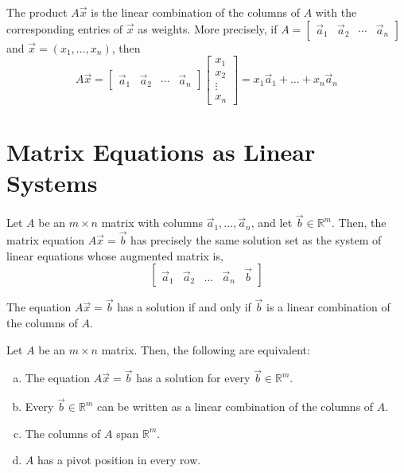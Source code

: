 \documentclass[letterpaper,12pt]{article}
\begin{document}
\begin{theorem}
The product $A\vec{x}$ is the linear combination of the columns of $A$ with the corresponding entries of $\vec{x}$ as weights. More precisely, if $A = \begin{bmatrix} \vec{a}_1 & \vec{a}_2 & \cdots & \vec{a}_n \end{bmatrix}$ and $\vec{x} = (x_1, \dots, x_n)$, then
\begin{equation*}
    \boxed{A \vec{x} = \begin{bmatrix} \vec{a}_1 & \vec{a}_2 & \cdots & \vec{a}_n \end{bmatrix} \begin{bmatrix} x_1 \\ x_2 \\ \vdots \\ x_n \end{bmatrix} = x_1 \vec{a}_1 + \dots + x_n \vec{a}_n}
\end{equation*}
\end{theorem}

\section*{Matrix Equations as Linear Systems}
\begin{theorem}
Let $A$ be an $m \times n$ matrix with columns $\vec{a}_1, \dots, \vec{a}_n$, and let $\vec{b} \in \mathbb{R}^m$. Then, the matrix equation $A\vec{x} = \vec{b}$ has precisely the same solution set as the system of linear equations whose augmented matrix is,
\begin{equation*}
    \begin{bmatrix} \vec{a}_1 & \vec{a}_2 & \dots & \vec{a}_n & \vec{b} \end{bmatrix}
\end{equation*}
\end{theorem}

\begin{corollary}
The equation $A\vec{x} = \vec{b}$ has a solution if and only if $\vec{b}$ is a linear combination of the columns of $A$.
\end{corollary}

\begin{theorem}
Let $A$ be an $m \times n$ matrix. Then, the following are equivalent:
\begin{enumerate}[(a)]
    \item The equation $A \vec{x} = \vec{b}$ has a solution for every $\vec{b} \in \mathbb{R}^m$.
    \item Every $\vec{b} \in \mathbb{R}^m$ can be written as a linear combination of the columns of $A$.
    \item The columns of $A$ span $\mathbb{R}^m$.
    \item $A$ has a pivot position in every row.
\end{enumerate}
\end{theorem}
\end{document}
